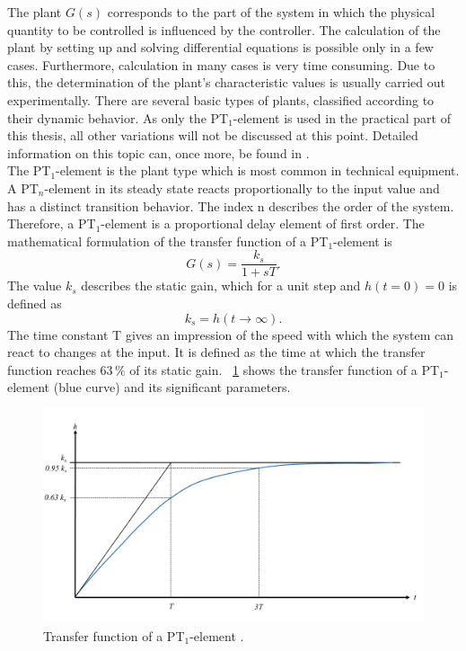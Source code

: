 The plant $G(s)$ corresponds to the part of the system in which the physical quantity to be controlled is influenced by the controller. The calculation of the plant by setting up and solving differential equations is possible only in a few cases. Furthermore, calculation in many cases is very time consuming. Due to this, the determination of the plant's characteristic values is usually carried out experimentally. There are several basic types of plants, classified according to their dynamic behavior. As only the PT$_{1}$-element is used in the practical part of this thesis, all other variations will not be discussed at this point. Detailed information on this topic can, once more, be found in \cite{Reg_10}.
\\The PT$_{1}$-element is the plant type which is most common in technical equipment. A PT$_{n}$-element in its steady state reacts proportionally to the input value and has a distinct transition behavior. The index n describes the order of the system. Therefore, a PT$_{1}$-element is a proportional delay element of first order. The mathematical formulation of the transfer function of a PT$_{1}$-element is
\begin{equation}
    G(s) = \frac{k_{s}}{1+sT}.
 \label{eq:tf_pt1}
\end{equation}
The value $k_{s}$ describes the static gain, which for a unit step and $h(t=0)=0$ is defined as
\begin{equation}
  k_s = h(t\rightarrow \infty).
\end{equation}
 The time constant T gives an impression of the speed with which the system can react to changes at the input. It is defined as the time at which the transfer function reaches $63\, \%$ of its static gain. \cite{Reg_10}
\figurename~\ref{fig:tf_pt1} shows the transfer function of a PT$_{1}$-element (blue curve) and its significant parameters.
\begin{figure}[ht]
   \centering
   \includegraphics[width=\textwidth]{images/chapt_3/tf_pt1.pdf}
   \caption[Transfer function of a PT$_{1}$-element]{Transfer function of a PT$_{1}$-element \cite{Reg_10}.}
   \label{fig:tf_pt1}
 \end{figure}

